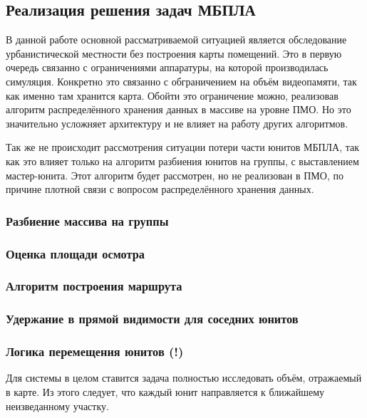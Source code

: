 \subsection{Реализация решения задач МБПЛА}

В данной работе основной рассматриваемой ситуацией является обследование
урбанистической местности без построения карты помещений. Это в первую
очередь связанно с ограничениями аппаратуры, на которой производилась 
симуляция. Конкретно это связанно с обграничением на объём видеопамяти,
так как именно там хранится карта. Обойти это ограничение можно, реализовав
алгоритм распределённого хранения данных в массиве на уровне ПМО. Но это
значительно усложняет архитектуру и не влияет на работу других алгоритмов.

Так же не происходит рассмотрения ситуации потери части юнитов МБПЛА, так как
это влияет только на алгоритм разбиения юнитов на группы, с выставлением 
мастер-юнита. Этот алгоритм будет рассмотрен, но не реализован в ПМО, по
причине плотной связи с вопросом распределённого хранения данных.

\subsubsection{Разбиение массива на группы}

\subsubsection{Оценка площади осмотра}

\subsubsection{Алгоритм построения маршрута}

\subsubsection{Удержание в прямой видимости для соседних юнитов}

\newpage
\subsubsection{Логика перемещения юнитов (!)}

Для системы в целом ставится задача полностью исследовать объём, отражаемый в карте.
Из этого следует, что каждый юнит направляется к ближайшему неизведанному участку.

